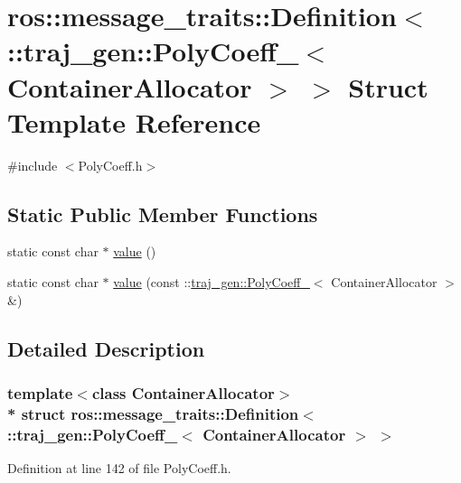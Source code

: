 \hypertarget{structros_1_1message__traits_1_1_definition_3_01_1_1traj__gen_1_1_poly_coeff___3_01_container_allocator_01_4_01_4}{}\section{ros\+:\+:message\+\_\+traits\+:\+:Definition$<$ \+:\+:traj\+\_\+gen\+:\+:Poly\+Coeff\+\_\+$<$ Container\+Allocator $>$ $>$ Struct Template Reference}
\label{structros_1_1message__traits_1_1_definition_3_01_1_1traj__gen_1_1_poly_coeff___3_01_container_allocator_01_4_01_4}


{\ttfamily \#include $<$Poly\+Coeff.\+h$>$}

\subsection*{Static Public Member Functions}
\begin{DoxyCompactItemize}
\item 
static const char $\ast$ \hyperlink{structros_1_1message__traits_1_1_definition_3_01_1_1traj__gen_1_1_poly_coeff___3_01_container_allocator_01_4_01_4_abfeb944be80decc84a6964652ef522cf}{value} ()
\item 
static const char $\ast$ \hyperlink{structros_1_1message__traits_1_1_definition_3_01_1_1traj__gen_1_1_poly_coeff___3_01_container_allocator_01_4_01_4_a6cc5c00e3fd2db1f1877e717365cc341}{value} (const \+::\hyperlink{structtraj__gen_1_1_poly_coeff__}{traj\+\_\+gen\+::\+Poly\+Coeff\+\_\+}$<$ Container\+Allocator $>$ \&)
\end{DoxyCompactItemize}


\subsection{Detailed Description}
\subsubsection*{template$<$class Container\+Allocator$>$\\*
struct ros\+::message\+\_\+traits\+::\+Definition$<$ \+::traj\+\_\+gen\+::\+Poly\+Coeff\+\_\+$<$ Container\+Allocator $>$ $>$}



Definition at line 142 of file Poly\+Coeff.\+h.




